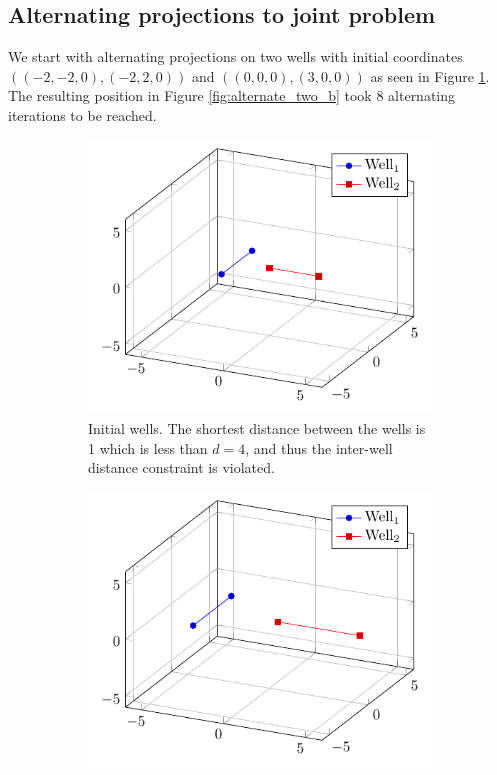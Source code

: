 \subsection{Alternating projections to joint problem}
%
We start with alternating projections on two wells with initial
coordinates $\left( (-2,-2,0), (-2,2,0) \right)$ and $\left( (0,0,0), (3,0,0) \right)$
as seen in Figure \ref{fig:alternate_two_a}. The resulting position in Figure 
\ref{fig:alternate_two_b} took 8 alternating iterations to be reached. 

%
\begin{figure}[H]
	\centering
	\begin{subfigure}{0.44\textwidth}
		\centering
		\includegraphics[width=1\textwidth]{figures/both_projections/two_wells_initial.pdf}
		\caption{Initial wells. The shortest distance between the wells is 1 which is
								 less than $d=4$, and thus the inter-well distance constraint is
								 violated.}
		\label{fig:alternate_two_a}
	\end{subfigure}%
	\hspace{.05\linewidth}
	\begin{subfigure}{0.44\textwidth}
		\centering
		\includegraphics[width=1\textwidth]{figures/both_projections/two_wells_moved.pdf}

\end{subfigure}
\end{figure}
